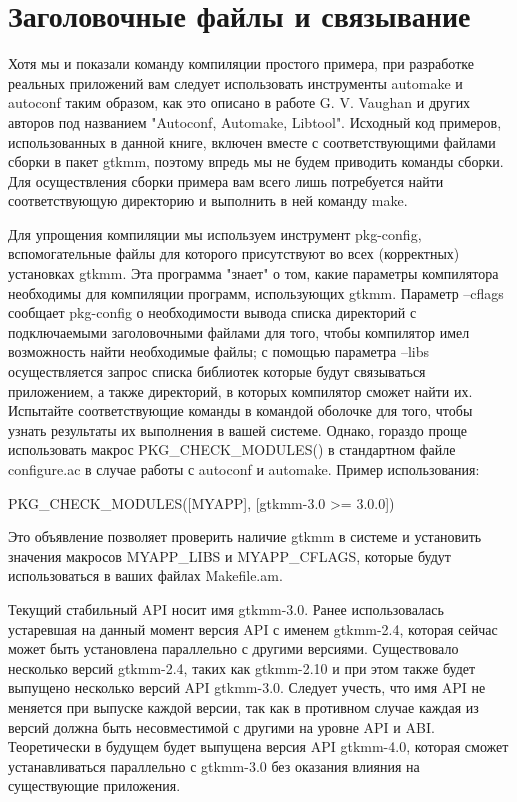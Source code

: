 \section{Заголовочные файлы и связывание}
 Хотя мы и показали команду компиляции простого примера, при разработке реальных приложений вам следует использовать инструменты automake и autoconf таким образом, как это описано в работе G. V. Vaughan и других авторов под названием "Autoconf, Automake, Libtool". Исходный код примеров, использованных в данной книге, включен вместе с соответствующими файлами сборки в пакет gtkmm, поэтому впредь мы не будем приводить команды сборки. Для осуществления сборки примера вам всего лишь потребуется найти соответствующую директорию и выполнить в ней команду make.

Для упрощения компиляции мы используем инструмент pkg-config, вспомогательные файлы для которого присутствуют во всех (корректных) установках gtkmm. Эта программа "знает" о том, какие параметры компилятора необходимы для компиляции программ, использующих gtkmm. Параметр --cflags сообщает pkg-config о необходимости вывода списка директорий с подключаемыми заголовочными файлами для того, чтобы компилятор имел возможность найти необходимые файлы; с помощью параметра --libs осуществляется запрос списка библиотек которые будут связываться приложением, а также директорий, в которых компилятор сможет найти их. Испытайте соответствующие команды в командой оболочке для того, чтобы узнать результаты их выполнения в вашей системе.
Однако, гораздо проще использовать макрос PKG\_CHECK\_MODULES() в стандартном файле configure.ac в случае работы с autoconf и automake. Пример использования:

PKG\_CHECK\_MODULES([MYAPP], [gtkmm-3.0 >= 3.0.0])

Это объявление позволяет проверить наличие gtkmm в системе и установить значения макросов MYAPP\_LIBS и MYAPP\_CFLAGS, которые будут использоваться в ваших файлах Makefile.am.

Текущий стабильный API носит имя gtkmm-3.0. Ранее использовалась устаревшая на данный момент версия API с именем gtkmm-2.4, которая сейчас может быть установлена параллельно с другими версиями. Существовало несколько версий gtkmm-2.4, таких как gtkmm-2.10 и при этом также будет выпущено несколько версий API gtkmm-3.0. Следует учесть, что имя API не меняется при выпуске каждой версии, так как в противном случае каждая из версий должна быть несовместимой с другими на уровне API и ABI. Теоретически в будущем будет выпущена версия API gtkmm-4.0, которая сможет устанавливаться параллельно с gtkmm-3.0 без оказания влияния на существующие приложения.

